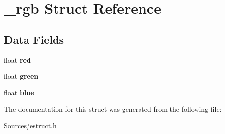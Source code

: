 \hypertarget{struct__rgb}{\section{\-\_\-rgb Struct Reference}
\label{struct__rgb}
}
\subsection*{Data Fields}
\begin{DoxyCompactItemize}
\item 
\hypertarget{struct__rgb_acddf4f34ba92c602d4205ba50e98d603}{float {\bfseries red}}\label{struct__rgb_acddf4f34ba92c602d4205ba50e98d603}

\item 
\hypertarget{struct__rgb_af8d69af46156237d69b44a880e4f486e}{float {\bfseries green}}\label{struct__rgb_af8d69af46156237d69b44a880e4f486e}

\item 
\hypertarget{struct__rgb_a322e0de27f54901aa172ae487dba2914}{float {\bfseries blue}}\label{struct__rgb_a322e0de27f54901aa172ae487dba2914}

\end{DoxyCompactItemize}


The documentation for this struct was generated from the following file\-:\begin{DoxyCompactItemize}
\item 
Sources/estruct.\-h\end{DoxyCompactItemize}
